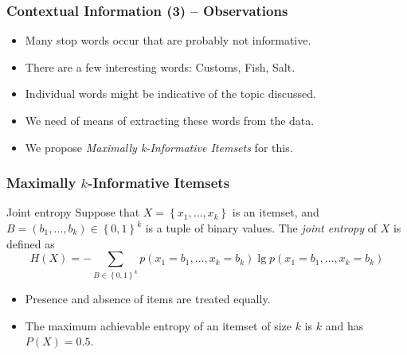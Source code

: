 \documentclass[12pt]{beamer}
\theoremstyle{break}
\begin{document}


\begin{frame}
	\frametitle{Contextual Information (3) -- Observations}

	\begin{itemize}
		\item Many stop words occur that are probably not informative.
		\item There are a few interesting words: Customs, Fish, Salt.
		\item Individual words might be indicative of the \alert{topic} discussed.
		\item We need of means of extracting these words from the data.
		\item We propose \emph{Maximally k-Informative Itemsets} for this.
	\end{itemize}
	
\end{frame}




\begin{frame}
	\frametitle{Maximally $k$-Informative Itemsets}
	
	\begin{block}{Joint entropy}
    	Suppose that $X = \left\{ x_{1}, \dots, x_{k} \right\}$ is an itemset, and $B = \left( b_{1}, \dots, b_{k} \right) \in \left\{ 0, 1 \right\}^{k}$ is a tuple of binary values. The \emph{joint entropy} of $X$ is defined as
    	\small
    	\begin{equation*}
        	H(X) = -\sum_{B \in \left\{ 0, 1 \right\}^{k}} p \left( x_{1} = b_{1}, \dots, x_{k} = b_{k} \right) \lg p \left( x_{1} = b_{1}, \dots, x_{k} = b_{k} \right)
    	\end{equation*}
    	\normalsize
	\end{block}
	
	\pause
	
	\begin{itemize}
		\item Presence and absence of items are treated equally.
		\item The maximum achievable entropy of an itemset of size $k$ is $k$ and has $P(X)=0.5$.
	\end{itemize}

\end{frame}


\end{document}
